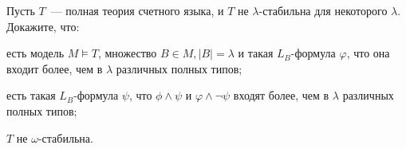 Пусть $T$~--- полная теория счетного языка, и $T$ не $\lambda$-стабильна для некоторого
$\lambda$. Докажите, что:
\begin{enumcyr}
    \item есть модель $M \models T$, множество $B \in M, |B| = \lambda$ и такая $L_B$-формула $\varphi$,
        что она входит более, чем в $\lambda$ различных полных типов;
    \item есть такая $L_B$-формула $\psi$, что $\phi \land \psi$ и $\varphi
        \land \neg \psi$ входят более, чем в $\lambda$ различных полных типов;
    \item $T$ не $\omega$-стабильна.
\end{enumcyr}